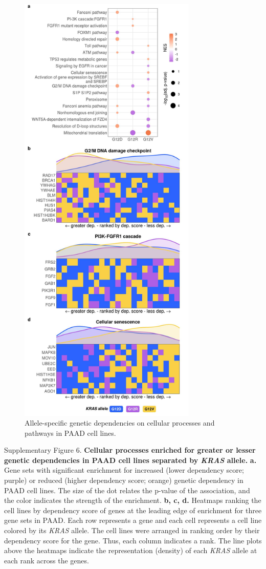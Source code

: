 \documentclass[english, 10pt, letterpaper]{article}
\newcommand{\KRAS}{\emph{KRAS}}
\begin{document}
\begin{figure}[h!]
\centering
\includegraphics[width=85mm]{figures/Supp_Fig_6.jpeg}
\caption{Allele-specific genetic dependencies on cellular processes and pathways in PAAD cell lines.}
\label{sfig:paad-dependency-gsea}
\end{figure}
\newpage
{
    \noindent Supplementary Figure 6. \textbf{Cellular processes enriched for greater or lesser genetic dependencies in PAAD cell lines separated by \KRAS{} allele.}
    \textbf{a.} Gene sets with significant enrichment for increased (lower dependency score; purple) or reduced (higher dependency score; orange) genetic dependency in PAAD cell lines. The size of the dot relates the p-value of the association, and the color indicates the strength of the enrichment.
    \textbf{b, c, d.} Heatmaps ranking the cell lines by dependency score of genes at the leading edge of enrichment for three gene sets in PAAD. Each row represents a gene and each cell represents a cell line colored by its \KRAS{} allele. The cell lines were arranged in ranking order by their dependency score for the gene. Thus, each column indicates a rank. The line plots above the heatmaps indicate the representation (density) of each \KRAS{} allele at each rank across the genes.\par
}
\newpage
\end{document}
